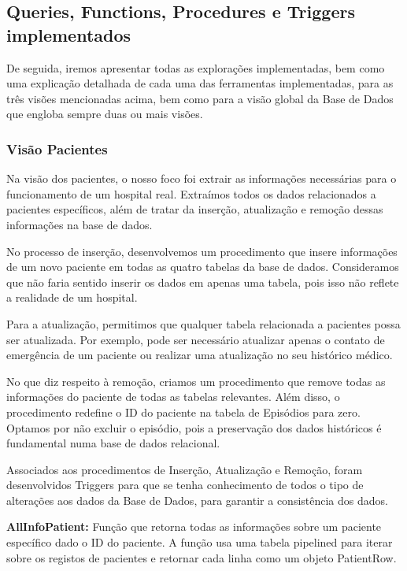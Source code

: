 \subsection{Queries, Functions, Procedures e Triggers implementados}

De seguida, iremos apresentar todas as explorações implementadas, bem como uma explicação detalhada de cada uma das ferramentas implementadas, para as três visões mencionadas acima, bem como para a visão global da Base de Dados que engloba sempre duas ou mais visões.

\subsubsection{Visão Pacientes}

Na visão dos pacientes, o nosso foco foi extrair as informações necessárias para o funcionamento de um hospital real. Extraímos todos os dados relacionados a pacientes específicos, além de tratar da inserção, atualização e remoção dessas informações na base de dados.

No processo de inserção, desenvolvemos um procedimento que insere informações de um novo paciente em todas as quatro tabelas da base de dados. Consideramos que não faria sentido inserir os dados em apenas uma tabela, pois isso não reflete a realidade de um hospital.

Para a atualização, permitimos que qualquer tabela relacionada a pacientes possa ser atualizada. Por exemplo, pode ser necessário atualizar apenas o contato de emergência de um paciente ou realizar uma atualização no seu histórico médico.

No que diz respeito à remoção, criamos um procedimento que remove todas as informações do paciente de todas as tabelas relevantes. Além disso, o procedimento redefine o ID do paciente na tabela de Episódios para zero. Optamos por não excluir o episódio, pois a preservação dos dados históricos é fundamental numa base de dados relacional.

Associados aos procedimentos de Inserção, Atualização e Remoção, foram desenvolvidos Triggers para que se tenha conhecimento de todos o tipo de alterações aos dados da Base de Dados, para garantir a consistência dos dados.

\vspace{0.15cm}
\textbf{AllInfoPatient:} Função que retorna todas as informações sobre um paciente específico dado o ID do paciente. A função usa uma tabela pipelined para iterar sobre os registos de pacientes e retornar cada linha como um objeto PatientRow.

